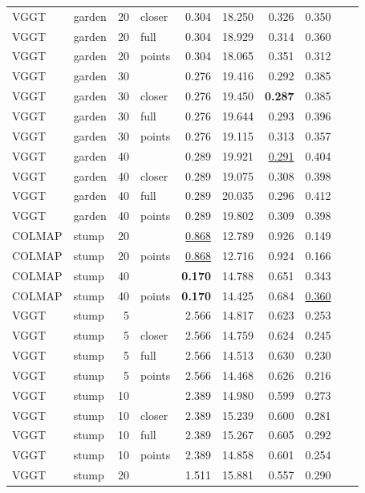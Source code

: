\begin{table}[H]
\begin{tabular}{llrlrrrrlr}
VGGT & garden & 20 & closer & 0.304 & 18.250 & 0.326 & 0.350 &  &  \\
VGGT & garden & 20 & full & 0.304 & 18.929 & 0.314 & 0.360 &  &  \\
VGGT & garden & 20 & points & 0.304 & 18.065 & 0.351 & 0.312 &  &  \\
VGGT & garden & 30 &  & 0.276 & 19.416 & 0.292 & 0.385 &  &  \\
VGGT & garden & 30 & closer & 0.276 & 19.450 & \textbf{0.287} & 0.385 &  &  \\
VGGT & garden & 30 & full & 0.276 & 19.644 & 0.293 & 0.396 &  &  \\
VGGT & garden & 30 & points & 0.276 & 19.115 & 0.313 & 0.357 &  &  \\
VGGT & garden & 40 &  & 0.289 & 19.921 & \underline{0.291} & 0.404 &  &  \\
VGGT & garden & 40 & closer & 0.289 & 19.075 & 0.308 & 0.398 &  &  \\
VGGT & garden & 40 & full & 0.289 & 20.035 & 0.296 & 0.412 &  &  \\
VGGT & garden & 40 & points & 0.289 & 19.802 & 0.309 & 0.398 &  &  \\
\midrule
COLMAP & stump & 20 &  & \underline{0.868} & 12.789 & 0.926 & 0.149 &  &  \\
COLMAP & stump & 20 & points & \underline{0.868} & 12.716 & 0.924 & 0.166 &  &  \\
COLMAP & stump & 40 &  & \textbf{0.170} & 14.788 & 0.651 & 0.343 &  &  \\
COLMAP & stump & 40 & points & \textbf{0.170} & 14.425 & 0.684 & \underline{0.360} &  &  \\
VGGT & stump & 5 &  & 2.566 & 14.817 & 0.623 & 0.253 &  &  \\
VGGT & stump & 5 & closer & 2.566 & 14.759 & 0.624 & 0.245 &  &  \\
VGGT & stump & 5 & full & 2.566 & 14.513 & 0.630 & 0.230 &  &  \\
VGGT & stump & 5 & points & 2.566 & 14.468 & 0.626 & 0.216 &  &  \\
VGGT & stump & 10 &  & 2.389 & 14.980 & 0.599 & 0.273 &  &  \\
VGGT & stump & 10 & closer & 2.389 & 15.239 & 0.600 & 0.281 &  &  \\
VGGT & stump & 10 & full & 2.389 & 15.267 & 0.605 & 0.292 &  &  \\
VGGT & stump & 10 & points & 2.389 & 14.858 & 0.601 & 0.254 &  &  \\
VGGT & stump & 20 &  & 1.511 & 15.881 & 0.557 & 0.290 &  &  \\

\end{tabular}
\end{table}
